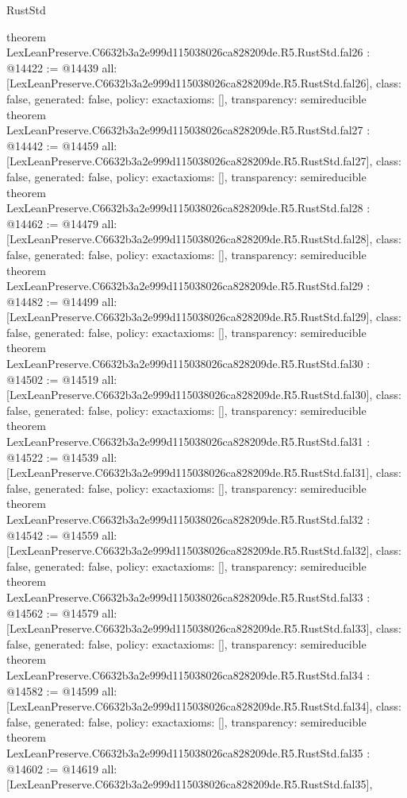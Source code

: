 \begin{lexlean}{RustStd}
\begin{coremodule}
{}
theorem LexLeanPreserve.C6632b3a2e999d115038026ca828209de.R5.RustStd.fal26 : @14422 := @14439 {
  all: [LexLeanPreserve.C6632b3a2e999d115038026ca828209de.R5.RustStd.fal26],
  class: false,
  generated: false,
  policy: exact{axioms: []},
  transparency: semireducible
}
theorem LexLeanPreserve.C6632b3a2e999d115038026ca828209de.R5.RustStd.fal27 : @14442 := @14459 {
  all: [LexLeanPreserve.C6632b3a2e999d115038026ca828209de.R5.RustStd.fal27],
  class: false,
  generated: false,
  policy: exact{axioms: []},
  transparency: semireducible
}
theorem LexLeanPreserve.C6632b3a2e999d115038026ca828209de.R5.RustStd.fal28 : @14462 := @14479 {
  all: [LexLeanPreserve.C6632b3a2e999d115038026ca828209de.R5.RustStd.fal28],
  class: false,
  generated: false,
  policy: exact{axioms: []},
  transparency: semireducible
}
theorem LexLeanPreserve.C6632b3a2e999d115038026ca828209de.R5.RustStd.fal29 : @14482 := @14499 {
  all: [LexLeanPreserve.C6632b3a2e999d115038026ca828209de.R5.RustStd.fal29],
  class: false,
  generated: false,
  policy: exact{axioms: []},
  transparency: semireducible
}
theorem LexLeanPreserve.C6632b3a2e999d115038026ca828209de.R5.RustStd.fal30 : @14502 := @14519 {
  all: [LexLeanPreserve.C6632b3a2e999d115038026ca828209de.R5.RustStd.fal30],
  class: false,
  generated: false,
  policy: exact{axioms: []},
  transparency: semireducible
}
theorem LexLeanPreserve.C6632b3a2e999d115038026ca828209de.R5.RustStd.fal31 : @14522 := @14539 {
  all: [LexLeanPreserve.C6632b3a2e999d115038026ca828209de.R5.RustStd.fal31],
  class: false,
  generated: false,
  policy: exact{axioms: []},
  transparency: semireducible
}
theorem LexLeanPreserve.C6632b3a2e999d115038026ca828209de.R5.RustStd.fal32 : @14542 := @14559 {
  all: [LexLeanPreserve.C6632b3a2e999d115038026ca828209de.R5.RustStd.fal32],
  class: false,
  generated: false,
  policy: exact{axioms: []},
  transparency: semireducible
}
theorem LexLeanPreserve.C6632b3a2e999d115038026ca828209de.R5.RustStd.fal33 : @14562 := @14579 {
  all: [LexLeanPreserve.C6632b3a2e999d115038026ca828209de.R5.RustStd.fal33],
  class: false,
  generated: false,
  policy: exact{axioms: []},
  transparency: semireducible
}
theorem LexLeanPreserve.C6632b3a2e999d115038026ca828209de.R5.RustStd.fal34 : @14582 := @14599 {
  all: [LexLeanPreserve.C6632b3a2e999d115038026ca828209de.R5.RustStd.fal34],
  class: false,
  generated: false,
  policy: exact{axioms: []},
  transparency: semireducible
}
theorem LexLeanPreserve.C6632b3a2e999d115038026ca828209de.R5.RustStd.fal35 : @14602 := @14619 {
  all: [LexLeanPreserve.C6632b3a2e999d115038026ca828209de.R5.RustStd.fal35],
}
\end{coremodule}
\end{lexlean}
